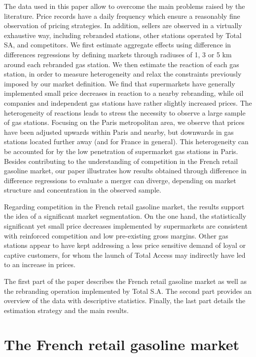 \documentclass[english]{article}
\begin{document}
The data used in this paper allow to overcome the main problems raised by the literature. Price records have a daily frequency which ensure a reasonably fine observation of pricing strategies. In addition, sellers are observed in a virtually exhaustive way, including rebranded stations, other stations operated by Total SA, and competitors. We first estimate aggregate effects using difference in differences regressions by defining markets through radiuses of 1, 3 or 5 km around each rebranded gas station. We then estimate the reaction of each gas station, in order to measure heterogeneity and relax the constraints previously imposed by our market definition. We find that supermarkets have generally implemented small price decreases in reaction to a nearby rebranding, while oil companies and independent gas stations have rather slightly increased prices. The heterogeneity of reactions leads to stress the necessity to observe a large sample of gas stations. Focusing on the Paris metropolitan area, we observe that prices have been adjusted upwards within Paris and nearby, but downwards in gas stations located further away (and for France in general). This heterogeneity can be accounted for by the low penetration of supermarket gas stations in Paris. Besides contributing to the understanding of competition in the French retail gasoline market, our paper illustrates how results obtained through difference in difference regressions to evaluate a merger can diverge, depending on market structure and concentration in the observed sample.

Regarding competition in the French retail gasoline market, the results support the idea of a significant market segmentation. On the one hand, the statistically significant yet small price decreases implemented by supermarkets are consistent with reinforced competition and low pre-existing gross margins. Other gas stations appear to have kept addressing a less price sensitive demand of loyal or captive customers, for whom the launch of Total Access may indirectly have led to an increase in prices.

The first part of the paper describes the French retail gasoline market as well as the rebranding operation implemented by Total S.A. The second part provides an overview of the data with descriptive statistics. Finally, the last part details the estimation strategy and the main results.

\section{The French retail gasoline market}
\end{document}
